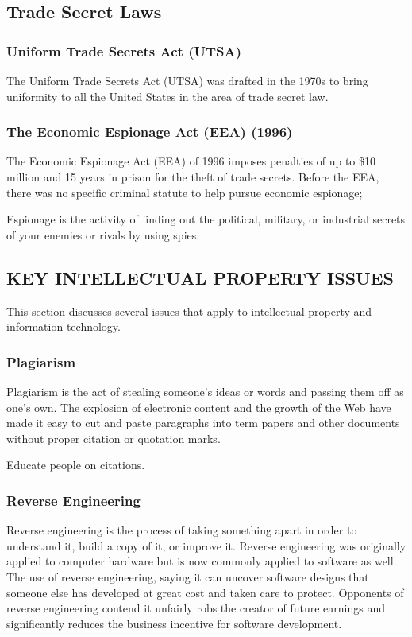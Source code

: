 \documentclass[11pt]{article}
\begin{document}
\subsection{Trade Secret Laws}
\label{sec:orgc930a71}
\subsubsection{Uniform Trade Secrets Act (UTSA)}
\label{sec:org5beed95}
The Uniform Trade Secrets Act (UTSA) was drafted in the 1970s to bring uniformity to all the United States in the area of trade secret law.
\subsubsection{The Economic Espionage Act (EEA) (1996)}
\label{sec:orgb769cec}
The Economic Espionage Act (EEA) of 1996 imposes penalties of up to \$10 million and 15 years in prison for the theft of trade secrets. Before the EEA, there was no specific criminal statute to help pursue economic espionage;

Espionage is the activity of finding out the political, military, or industrial secrets of your enemies or rivals by using spies. 
\subsection{KEY INTELLECTUAL PROPERTY ISSUES}
\label{sec:orge88874d}
This section discusses several issues that apply to intellectual property and information technology.
\subsubsection{Plagiarism}
\label{sec:orgee6784b}
Plagiarism is the act of stealing someone’s ideas or words and passing them off as one’s own. The explosion of electronic content and the growth of the Web have made it easy to cut and paste paragraphs into term papers and other documents without proper citation or quotation marks.

Educate people on citations.
\subsubsection{Reverse Engineering}
\label{sec:org86da48f}
Reverse engineering is the process of taking something apart in order to understand it, build a copy of it, or improve it. Reverse engineering was originally applied to computer hardware but is now commonly applied to software as well.
The use of reverse engineering, saying it can uncover software designs that someone else has developed at great cost and taken care to protect. Opponents of reverse engineering contend it unfairly robs the creator of future earnings and significantly reduces the business incentive for software development.
\end{document}
